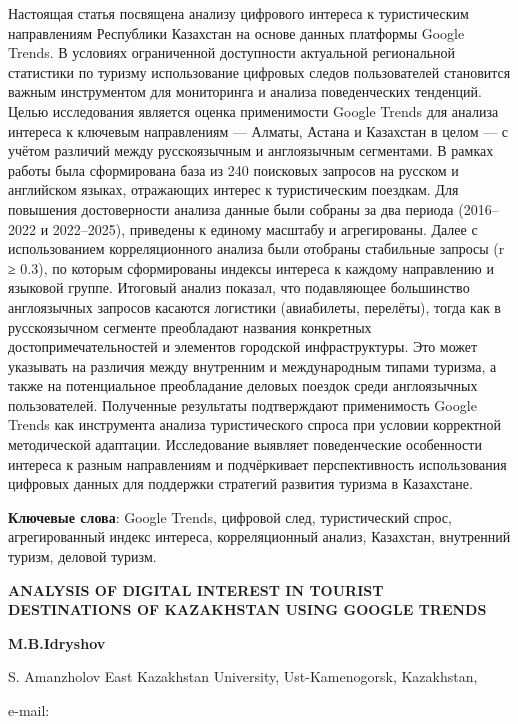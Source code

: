 Настоящая статья посвящена анализу цифрового интереса к туристическим
направлениям Республики Казахстан на основе данных платформы Google
Trends. В условиях ограниченной доступности актуальной региональной
статистики по туризму использование цифровых следов пользователей
становится важным инструментом для мониторинга и анализа поведенческих
тенденций. Целью исследования является оценка применимости Google Trends
для анализа интереса к ключевым направлениям --- Алматы, Астана и
Казахстан в целом --- с учётом различий между русскоязычным и
англоязычным сегментами. В рамках работы была сформирована база из 240
поисковых запросов на русском и английском языках, отражающих интерес к
туристическим поездкам. Для повышения достоверности анализа данные были
собраны за два периода (2016--2022 и 2022--2025), приведены к единому
масштабу и агрегированы. Далее с использованием корреляционного анализа
были отобраны стабильные запросы (r ≥ 0.3), по которым сформированы
индексы интереса к каждому направлению и языковой группе. Итоговый
анализ показал, что подавляющее большинство англоязычных запросов
касаются логистики (авиабилеты, перелёты), тогда как в русскоязычном
сегменте преобладают названия конкретных достопримечательностей и
элементов городской инфраструктуры. Это может указывать на различия
между внутренним и международным типами туризма, а также на
потенциальное преобладание деловых поездок среди англоязычных
пользователей. Полученные результаты подтверждают применимость Google
Trends как инструмента анализа туристического спроса при условии
корректной методической адаптации. Исследование выявляет поведенческие
особенности интереса к разным направлениям и подчёркивает
перспективность использования цифровых данных для поддержки стратегий
развития туризма в Казахстане.

{\bfseries Ключевые слова}: Google Trends, цифровой след, туристический
спрос, агрегированный индекс интереса, корреляционный анализ, Казахстан,
внутренний туризм, деловой туризм.

{\bfseries ANALYSIS OF DIGITAL INTEREST IN TOURIST DESTINATIONS OF
KAZAKHSTAN USING GOOGLE TRENDS}

{\bfseries M.B.Idryshov}

S. Amanzholov East Kazakhstan University, Ust-Kamenogorsk, Kazakhstan,

e-mail:~\href{mailto:immakhambet@gmail.com}{}

